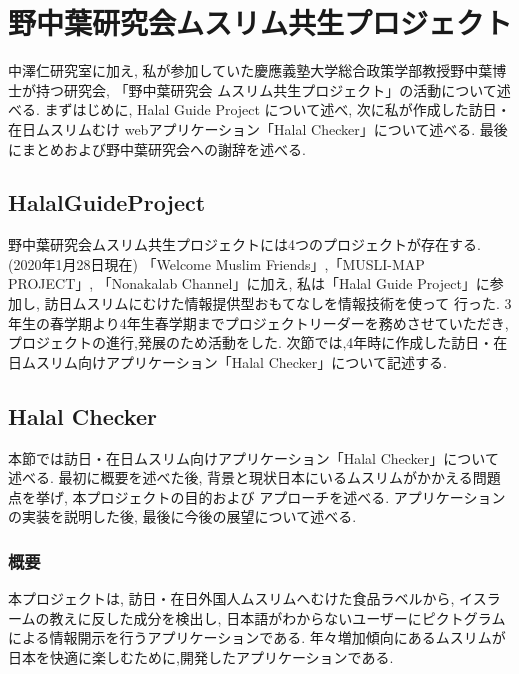 \chapter{野中葉研究会ムスリム共生プロジェクト}
中澤仁研究室に加え, 私が参加していた慶應義塾大学総合政策学部教授野中葉博士が持つ研究会,
「野中葉研究会 ムスリム共生プロジェクト」の活動について述べる.
まずはじめに, Halal Guide Project について述べ, 次に私が作成した訪日・在日ムスリムむけ
webアプリケーション「Halal Checker」について述べる.
最後にまとめおよび野中葉研究会への謝辞を述べる.

\section{HalalGuideProject}
野中葉研究会ムスリム共生プロジェクトには4つのプロジェクトが存在する.(2020年1月28日現在)
「Welcome Muslim Friends」,「MUSLI-MAP PROJECT」, 「Nonakalab Channel」に加え,
私は「Halal Guide Project」に参加し, 訪日ムスリムにむけた情報提供型おもてなしを情報技術を使って
行った. 3年生の春学期より4年生春学期までプロジェクトリーダーを務めさせていただき,
プロジェクトの進行,発展のため活動をした.
次節では,4年時に作成した訪日・在日ムスリム向けアプリケーション「Halal Checker」について記述する.

\section{Halal Checker}
本節では訪日・在日ムスリム向けアプリケーション「Halal Checker」について述べる.
最初に概要を述べた後, 背景と現状日本にいるムスリムがかかえる問題点を挙げ, 本プロジェクトの目的および
アプローチを述べる. アプリケーションの実装を説明した後, 最後に今後の展望について述べる.
\subsection{概要}
本プロジェクトは, 訪日・在日外国人ムスリムへむけた食品ラベルから, イスラームの教えに反した成分を検出し,
日本語がわからないユーザーにピクトグラムによる情報開示を行うアプリケーションである.
年々増加傾向にあるムスリムが日本を快適に楽しむために,開発したアプリケーションである.

